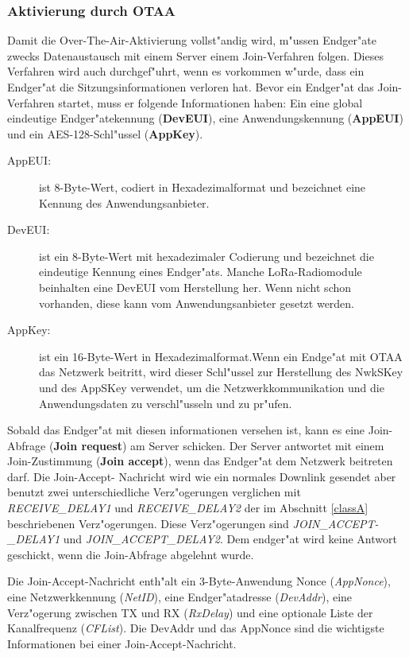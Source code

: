 \subsubsection{Aktivierung durch OTAA}
Damit die Over-The-Air-Aktivierung vollst"andig wird, m"ussen Endger"ate zwecks Datenaustausch mit einem Server einem Join-Verfahren folgen. Dieses Verfahren wird auch durchgef"uhrt, wenn es vorkommen w"urde, dass ein Endger"at die Sitzungsinformationen verloren hat.
Bevor ein Endger"at das Join-Verfahren startet, muss er folgende Informationen haben: Ein eine global eindeutige Endger"atekennung (\textbf{DevEUI}), eine Anwendungskennung (\textbf{AppEUI}) und ein AES-128-Schl"ussel (\textbf{AppKey}). 

\begin{description}
	\item[AppEUI:] ist 8-Byte-Wert, codiert in Hexadezimalformat und bezeichnet eine Kennung des Anwendungsanbieter.
	\item[DevEUI:] ist ein 8-Byte-Wert mit hexadezimaler Codierung und bezeichnet die eindeutige Kennung eines Endger"ats. Manche LoRa-Radiomodule beinhalten eine DevEUI vom Herstellung her. Wenn nicht schon vorhanden, diese kann vom Anwendungsanbieter gesetzt werden.
	\item[AppKey:] ist ein 16-Byte-Wert in Hexadezimalformat.Wenn ein Endge"at mit OTAA das Netzwerk beitritt, wird dieser Schl"ussel zur Herstellung des NwkSKey und des AppSKey verwendet, um die Netzwerkkommunikation und die Anwendungsdaten zu verschl"usseln und zu pr"ufen. 
\end{description}

Sobald das Endger"at mit diesen informationen versehen ist, kann es eine Join-Abfrage (\textbf{Join request}) am Server schicken. Der Server antwortet mit einem Join-Zustimmung (\textbf{Join accept}), wenn das Endger"at dem Netzwerk beitreten darf. Die Join-Accept- Nachricht wird wie ein normales Downlink gesendet aber benutzt zwei unterschiedliche Verz"ogerungen verglichen mit \textit{RECEIVE\_DELAY1} und \textit{RECEIVE\_DELAY2} der im Abschnitt \ref{classA} beschriebenen Verz"ogerungen. Diese Verz"ogerungen sind \textit{JOIN\_ACCEPT-\_DELAY1} und \textit{JOIN\_ACCEPT\_DELAY2}. Dem endger"at wird keine Antwort geschickt, wenn die Join-Abfrage abgelehnt wurde.

Die Join-Accept-Nachricht enth"alt ein 3-Byte-Anwendung Nonce (\textit{AppNonce}), eine Netzwerkkennung (\textit{NetID}), eine Endger"atadresse (\textit{DevAddr}), eine Verz"ogerung zwischen TX und RX (\textit{RxDelay}) und eine optionale Liste der Kanalfrequenz (\textit{CFList}). Die DevAddr und das AppNonce sind die wichtigste Informationen bei einer Join-Accept-Nachricht.

